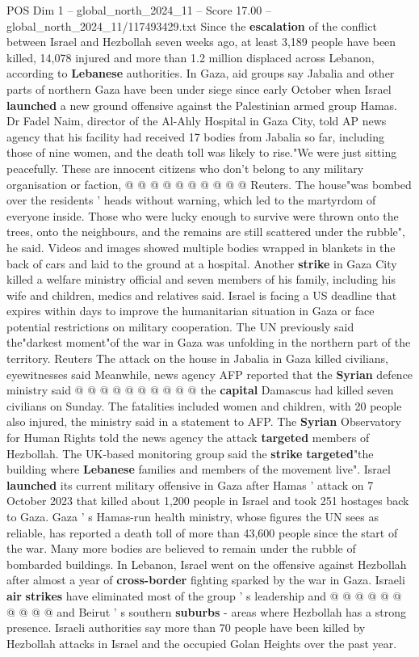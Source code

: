 \begin{textsample}{POS Dim 1 – global\_north\_2024\_11 – Score 17.00 – global\_north\_2024\_11/117493429.txt}
Since the \textbf{escalation} of the conflict between Israel and Hezbollah seven weeks ago, at least 3,189 people have been killed, 14,078 injured and more than 1.2 million displaced across Lebanon, according to \textbf{Lebanese} authorities.
In Gaza, aid groups say Jabalia and other parts of northern Gaza have been under siege since early October when Israel \textbf{launched} a new ground offensive against the Palestinian armed group Hamas.
Dr Fadel Naim, director of the Al-Ahly Hospital in Gaza City, told AP news agency that his facility had received 17 bodies from Jabalia so far, including those of nine women, and the death toll was likely to rise."We were just sitting peacefully.
These are innocent citizens who don't belong to any military organisation or faction, @ @ @ @ @ @ @ @ @ @ Reuters.
The house"was bombed over the residents ' heads without warning, which led to the martyrdom of everyone inside.
Those who were lucky enough to survive were thrown onto the trees, onto the neighbours, and the remains are still scattered under the rubble", he said.
Videos and images showed multiple bodies wrapped in blankets in the back of cars and laid to the ground at a hospital.
Another \textbf{strike} in Gaza City killed a welfare ministry official and seven members of his family, including his wife and children, medics and relatives said.
Israel is facing a US deadline that expires within days to improve the humanitarian situation in Gaza or face potential restrictions on military cooperation.
The UN previously said the"darkest moment"of the war in Gaza was unfolding in the northern part of the territory.
Reuters The attack on the house in Jabalia in Gaza killed civilians, eyewitnesses said Meanwhile, news agency AFP reported that the \textbf{Syrian} defence ministry said @ @ @ @ @ @ @ @ @ @ the \textbf{capital} Damascus had killed seven civilians on Sunday.
The fatalities included women and children, with 20 people also injured, the ministry said in a statement to AFP.
The \textbf{Syrian} Observatory for Human Rights told the news agency the attack \textbf{targeted} members of Hezbollah.
The UK-based monitoring group said the \textbf{strike} \textbf{targeted}"the building where \textbf{Lebanese} families and members of the movement live".
Israel \textbf{launched} its current military offensive in Gaza after Hamas ' attack on 7 October 2023 that killed about 1,200 people in Israel and took 251 hostages back to Gaza.
Gaza ' s Hamas-run health ministry, whose figures the UN sees as reliable, has reported a death toll of more than 43,600 people since the start of the war.
Many more bodies are believed to remain under the rubble of bombarded buildings.
In Lebanon, Israel went on the offensive against Hezbollah after almost a year of \textbf{cross-border} fighting sparked by the war in Gaza.
Israeli \textbf{air} \textbf{strikes} have eliminated most of the group ' s leadership and @ @ @ @ @ @ @ @ @ @ and Beirut ' s southern \textbf{suburbs} - areas where Hezbollah has a strong presence.
Israeli authorities say more than 70 people have been killed by Hezbollah attacks in Israel and the occupied Golan Heights over the past year.


\end{textsample}

